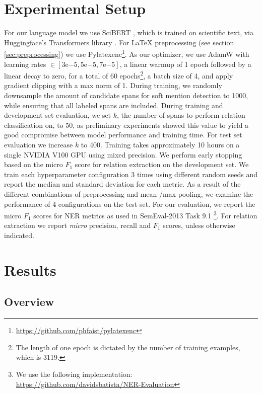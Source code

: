 \documentclass[11pt]{article}
\begin{document}
\section{Experimental Setup}






For our language model we use SciBERT \cite{beltagy_scibert_2019}, which is trained on scientific text, via Huggingface's Transformers library \cite{wolf_transformers_2020}. 
For LaTeX preprocessing (see section \ref{sec:preprocessing}) we use Pylatexenc\footnote{\url{https://github.com/phfaist/pylatexenc}}. 
As our optimizer, we use AdamW \cite{loshchilov_decoupled_2019} with learning rates $\in [3\mathrm{e}{-5}, 5\mathrm{e}{-5}, 7\mathrm{e}{-5}]$, a linear warmup of 1 epoch followed by a linear decay to zero, for a total of 60 epochs\footnote{The length of one epoch is dictated by the number of training examples, which is 3119.}, a batch size of 4, and apply gradient clipping with a max norm of 1. 
During training, we randomly downsample the amount of candidate spans for soft mention detection to 1000, while ensuring that all labeled spans are included. During training and development set evaluation, we set $k$, the number of spans to perform relation classification on, to 50, as preliminary experiments showed this value to yield a good compromise between model performance and training time. For test set evaluation we increase $k$ to 400.
Training takes approximately 10 hours on a single NVIDIA V100 GPU using mixed precision. 
We perform early stopping based on the micro $F_1$ score for relation extraction on the development set. 
We train each hyperparameter configuration 3 times using different random seeds and report the median and standard deviation for each metric. 
As a result of the different combinations of preprocessing and mean-/max-pooling, we examine the performance of 4 configurations on the test set.
For our evaluation, we report the micro $F_1$ scores for NER metrics as used in SemEval-2013 Task 9.1 \cite{segura-bedmar_semeval-2013_2013}\footnote{We use the following implementation: \url{https://github.com/davidsbatista/NER-Evaluation}}.
For relation extraction we report \textit{micro} precision, recall and $F_1$ scores, unless otherwise indicated.
\section{Results}



\subsection{Overview}
\end{document}
